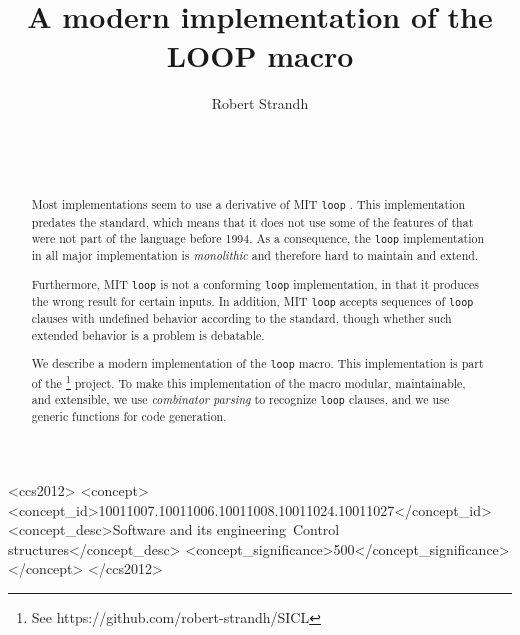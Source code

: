 \documentclass{sig-alternate-05-2015}
\def\inputtex#1{}
\def\mitloop{MIT \texttt{loop}}
\begin{document}
\title{A modern implementation of the LOOP macro}
\author{\alignauthor
Robert Strandh\\
\\
\\
\\
}

\maketitle

\begin{abstract}
Most \commonlisp{} implementations seem to use a derivative of
\mitloop{} \cite{Burke:Moon:MIT.loop}.  This implementation predates
the \commonlisp{} standard, which means that it does not use some of
the features of \commonlisp{} that were not part of the language
before 1994.  As a consequence, the \texttt{loop} implementation in
all major \commonlisp{} implementation is \emph{monolithic} and
therefore hard to maintain and extend.

Furthermore, \mitloop{} is not a conforming \texttt{loop}
implementation, in that it produces the wrong result for certain
inputs.  In addition, \mitloop{} accepts sequences of \texttt{loop}
clauses with undefined behavior according to the standard, though
whether such extended behavior is a problem is debatable.

We describe a modern implementation of the \commonlisp{} \texttt{loop}
macro.  This implementation is part of the \sicl{}%
\footnote{See https://github.com/robert-strandh/SICL}
project.  To make
this implementation of the macro modular, maintainable, and
extensible, we use \emph{combinator parsing} to recognize
\texttt{loop} clauses, and we use \clos{} generic functions for code
generation.
\end{abstract}

\begin{CCSXML}
  <ccs2012>
  <concept>
  <concept_id>10011007.10011006.10011008.10011024.10011027</concept_id>
  <concept_desc>Software and its engineering~Control structures</concept_desc>
  <concept_significance>500</concept_significance>
  </concept>
  </ccs2012>
\end{CCSXML}


\printccsdesc


\inputtex{sec-introduction.tex}
\inputtex{sec-previous.tex}
\inputtex{sec-our-method.tex}
\inputtex{sec-benefits.tex}
\inputtex{sec-conclusions.tex}
\inputtex{sec-acknowledgments.tex}



\end{document}
